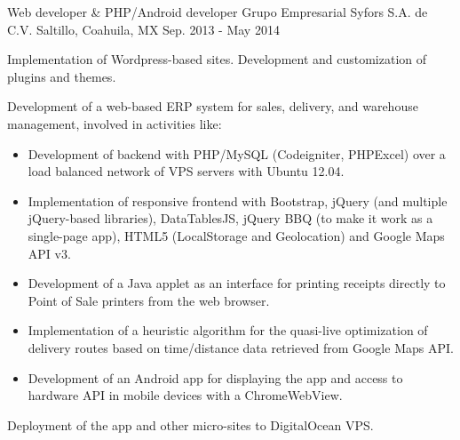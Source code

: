 \begin{cventries}
\cventry
{Web developer \& PHP/Android developer} %
{Grupo Empresarial Syfors S.A. de C.V.} %
{Saltillo, Coahuila, MX} %
{Sep. 2013 - May 2014} %
{ %
	\begin{cvitems}
		\item {Implementation of Wordpress-based sites. Development and customization of plugins and themes.}
		\item {Development of a web-based ERP system for sales, delivery, and warehouse management, involved in activities like:}
		\begin{itemize}
			\item {Development of backend with PHP/MySQL (Codeigniter, PHPExcel) over a load balanced network of VPS servers with Ubuntu 12.04.}
			\item {Implementation of responsive frontend with Bootstrap, jQuery (and multiple jQuery-based libraries), DataTablesJS, jQuery BBQ (to make it work as a single-page app), HTML5 (LocalStorage and Geolocation) and Google Maps API v3.}
			\item {Development of a Java applet as an interface for printing receipts directly to Point of Sale printers from the web browser.}
			\item {Implementation of a heuristic algorithm for the quasi-live optimization of delivery routes based on time/distance data retrieved from Google Maps API.}
			\item {Development of an Android app for displaying the app and access to hardware API in mobile devices with a ChromeWebView.}
		\end{itemize}
		\item {Deployment of the app and other micro-sites to DigitalOcean VPS.}
	\end{cvitems} 
}



\end{cventries}
